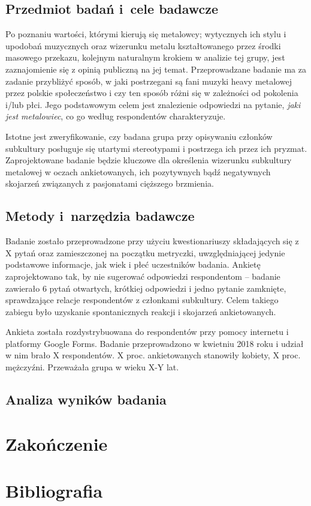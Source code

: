 \documentclass[12pt, a4paper, titlepage]{report}
\begin{document}
\section{Przedmiot badań i~cele badawcze}
Po poznaniu wartości, którymi kierują się metalowcy; wytycznych ich stylu i upodobań muzycznych oraz wizerunku metalu kształtowanego przez środki masowego przekazu, kolejnym naturalnym krokiem w analizie tej grupy, jest zaznajomienie się z opinią publiczną na jej temat. Przeprowadzane badanie ma za zadanie przybliżyć sposób, w jaki postrzegani są fani muzyki heavy metalowej przez polskie społeczeństwo i czy ten sposób różni się w zależności od pokolenia i/lub płci. Jego podstawowym celem jest znalezienie odpowiedzi na pytanie, \emph{jaki jest metalowiec}, co go według respondentów charakteryzuje. 

Istotne jest zweryfikowanie, czy badana grupa przy opisywaniu członków subkultury posługuje się utartymi stereotypami i postrzega ich przez ich pryzmat. Zaprojektowane badanie będzie kluczowe dla określenia wizerunku subkultury metalowej w oczach ankietowanych, ich pozytywnych bądź negatywnych skojarzeń związanych z pasjonatami cięższego brzmienia. 

\section{Metody i~narzędzia badawcze}
Badanie zostało przeprowadzone przy użyciu kwestionariuszy składających się z X pytań oraz zamieszczonej na początku metryczki, uwzględniającej jedynie podstawowe informacje, jak wiek i płeć uczestników badania. Ankietę zaprojektowano tak, by nie sugerować odpowiedzi respondentom -- badanie zawierało 6 pytań otwartych, krótkiej odpowiedzi i jedno pytanie zamknięte, sprawdzające relacje respondentów z członkami subkultury. Celem takiego zabiegu było uzyskanie spontanicznych reakcji i skojarzeń ankietowanych. 

Ankieta została rozdystrybuowana do respondentów przy pomocy internetu i platformy Google Forms. Badanie przeprowadzono w kwietniu 2018 roku i udział w nim brało X respondentów. X proc. ankietowanych stanowiły kobiety, X proc. mężczyźni. Przeważała grupa w wieku X-Y lat. 

\section{Analiza wyników badania}
\chapter*{Zakończenie}
\chapter*{Bibliografia}
\end{document}
